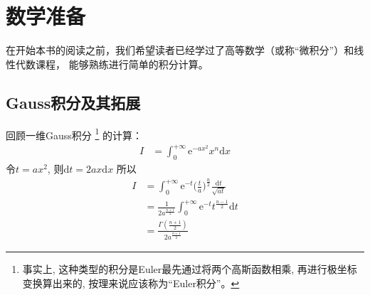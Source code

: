 \chapter{数学准备}

    在开始本书的阅读之前，我们希望读者已经学过了高等数学（或称“微积分”）和线性代数课程，
    能够熟练进行简单的积分计算。

    \section{Gauss积分及其拓展}
        回顾一维Gauss积分
        \footnote{事实上, 这种类型的积分是Euler最先通过将两个高斯函数相乘, 
        再进行极坐标变换算出来的, 按理来说应该称为“Euler积分”。}
        的计算：
        \begin{equation}
            \begin{aligned}
                I &= \int_0^{+\infty} \mathrm{e}^{-ax^2} x^{n} \mathrm{d}x
            \end{aligned}
        \end{equation}
        令$t = ax^2$, 则$\mathrm{d}t = 2ax\mathrm{d}x$
        所以
        \begin{equation}
            \begin{aligned}
                I &= \int_0^{+\infty} \mathrm{e}^{-t} \bigg(\frac ta\bigg)^{\frac n2} \frac {\mathrm{d}t}{\sqrt{at}}\\
                &= \frac 1{2a^{\frac {n+1}2}} \int_0^{+\infty} \mathrm{e}^{-t} t^{\frac {n-1}2} \mathrm{d}t\\
                &= \frac {\Gamma(\frac {n+1}2)}{2a^{\frac {n+1}2}}
            \end{aligned}
        \end{equation}

